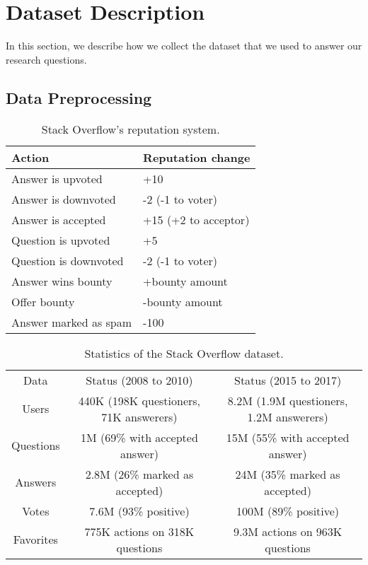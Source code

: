 \section{Dataset Description}
In this section, we describe how we collect the dataset that we used to answer our research questions.

\subsection{Data Preprocessing}

\begin{table}[]
	\centering
	\small
	\caption{Stack Overflow’s reputation system.}
	\label{tab:stackoverflow_rep}
\begin{tabular}{ll}
Action                & Reputation change    \\ \hline
Answer is upvoted     & +10                  \\
Answer is downvoted   & -2 (-1 to voter)     \\
Answer is accepted    & +15 (+2 to acceptor) \\
Question is upvoted   & +5                   \\
Question is downvoted & -2 (-1 to voter)     \\
Answer wins bounty    & +bounty amount       \\
Offer bounty          & -bounty amount       \\
Answer marked as spam & -100                
\end{tabular}
\end{table}


\begin{table*}[]
	\centering
	\small
	\caption{Statistics of the Stack Overflow dataset.}
	\label{tab:stackoverflow_stat}
\begin{tabular}{c|c|c}
Data      & Status (2008 to 2010)                  & Status (2015 to 2017)                   \\
Users     & 440K (198K questioners, 71K answerers) & 8.2M (1.9M questioners, 1.2M answerers) \\
Questions & 1M (69\% with accepted answer)         & 15M (55\% with accepted answer)         \\
Answers   & 2.8M (26\% marked as accepted)         & 24M (35\% marked as accepted)           \\
Votes     & 7.6M (93\% positive)                   & 100M (89\% positive)                    \\
Favorites & 775K actions on 318K questions         & 9.3M actions on 963K questions         
\end{tabular}
\end{table*}


